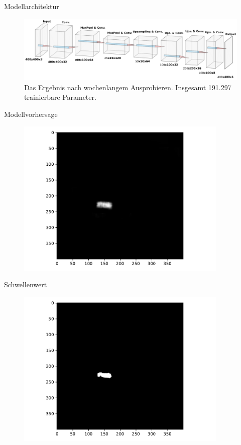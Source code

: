 \begin{frame}{Modellarchitektur}
    \begin{figure}
        \centering
        \includegraphics[width=\textwidth]{img/nn.pdf}
        \caption{Das Ergebnis nach wochenlangem Ausprobieren. Insgesamt 191.297 trainierbare Parameter.}
    \end{figure}
\end{frame}

\begin{frame}{Modellvorhersage}
    \begin{figure}
        \centering
        \includegraphics[width=0.9\textwidth]{img/model_demo_3}
    \end{figure}
\end{frame}

\begin{frame}{Schwellenwert}
    \begin{figure}
        \centering
        \includegraphics[width=0.9\textwidth]{img/model_demo_4}
    \end{figure}
\end{frame}

